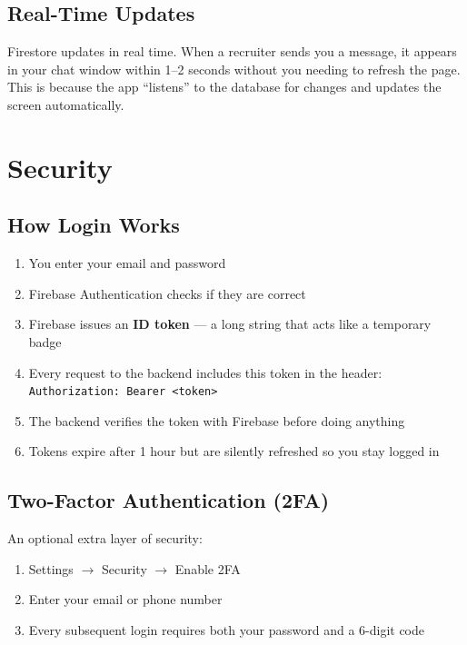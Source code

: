 \documentclass[12pt, a4paper]{report}
\newcommand{\code}[1]{\texttt{\small #1}}
\begin{document}
\section{Real-Time Updates}

Firestore updates in real time.  When a recruiter sends you a message, it
appears in your chat window within 1--2 seconds without you needing to refresh
the page.  This is because the app ``listens'' to the database for changes and
updates the screen automatically.

\chapter{Security}

\section{How Login Works}

\begin{enumerate}
  \item You enter your email and password
  \item Firebase Authentication checks if they are correct
  \item Firebase issues an \textbf{ID token} --- a long string that acts like a
        temporary badge
  \item Every request to the backend includes this token in the header:\\
        \code{Authorization: Bearer \textless{}token\textgreater{}}
  \item The backend verifies the token with Firebase before doing anything
  \item Tokens expire after 1 hour but are silently refreshed so you stay logged in
\end{enumerate}

\section{Two-Factor Authentication (2FA)}

An optional extra layer of security:
\begin{enumerate}
  \item Settings $\to$ Security $\to$ Enable 2FA
  \item Enter your email or phone number
  \item Every subsequent login requires both your password and a 6-digit code
\end{enumerate}
\end{document}
